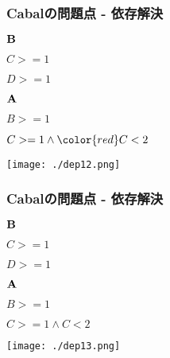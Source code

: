 \documentclass[cjk,dvipdfm,14pt]{beamer}
\begin{document}
\begin{frame}
\frametitle{Cabalの問題点 - 依存解決}

\begin{description}
\item ${\bf B}$
\item
  \begin{description}
  \item $C >= 1$
  \item $D >= 1$
  \end{description}
\end{description}

\begin{description}
\item ${\bf A}$
\item
  \begin{description}
  \item $B >= 1$
  \item $C >= 1 \wedge {\color{red} C < 2}$
  \end{description}
\end{description}

\texttt{[image: ./dep12.png]}
\end{frame}

\begin{frame}
\frametitle{Cabalの問題点 - 依存解決}

\begin{description}
\item ${\bf B}$
\item
  \begin{description}
  \item $C >= 1$
  \item $D >= 1$
  \end{description}
\end{description}

\begin{description}
\item ${\bf A}$
\item
  \begin{description}
  \item $B >= 1$
  \item $C >= 1 \wedge C < 2$
  \end{description}
\end{description}

\texttt{[image: ./dep13.png]}
\end{frame}
\end{document}
